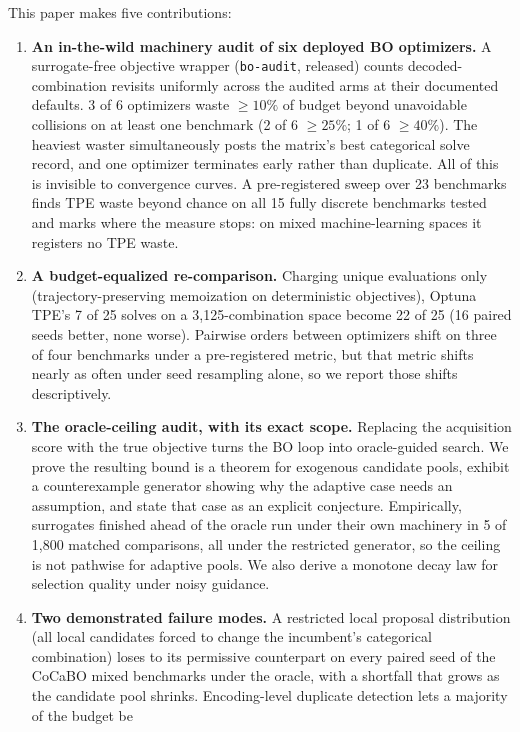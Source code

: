 \documentclass[%
 aip,
 amsmath,amssymb,
 floatfix,
 reprint,%
]{revtex4-1}
\begin{document}
This paper makes five contributions:
\begin{enumerate}
  \item \textbf{An in-the-wild machinery audit of six deployed BO
  optimizers.} A surrogate-free objective wrapper (\texttt{bo-audit},
  released) counts decoded-combination revisits uniformly across the
  audited arms at their documented defaults. 3 of 6 optimizers
  waste ${\ge}10\%$ of budget beyond unavoidable collisions on at least
  one benchmark (2 of 6 ${\ge}25\%$; 1 of 6 ${\ge}40\%$). The heaviest
  waster simultaneously posts the matrix's best categorical solve record, and one
  optimizer terminates early rather than duplicate. All of this is invisible
  to convergence curves. A pre-registered sweep over 23 benchmarks
  finds TPE waste beyond chance on all 15 fully discrete benchmarks
  tested and marks
  where the measure stops: on mixed machine-learning spaces it registers
  no TPE waste.
  \item \textbf{A budget-equalized re-comparison.} Charging unique
  evaluations only (trajectory-preserving memoization on deterministic
  objectives), Optuna TPE's 7 of 25 solves on a 3{,}125-combination
  space become 22 of 25 (16 paired seeds better, none worse). Pairwise
  orders between optimizers shift on three of four benchmarks under a
  pre-registered metric, but that metric shifts nearly as often under
  seed resampling alone, so we report those shifts descriptively.
  \item \textbf{The oracle-ceiling audit, with its exact scope.}
  Replacing the acquisition score with the true objective turns the BO
  loop into oracle-guided search. We prove the resulting bound is a
  theorem for exogenous candidate pools, exhibit a counterexample
  generator showing why the adaptive case needs an assumption, and state
  that case as an explicit conjecture. Empirically, surrogates finished
  ahead of the oracle run under their own machinery in 5 of 1{,}800
  matched comparisons, all under the restricted generator, so the
  ceiling is not pathwise for adaptive pools. We also derive a
  monotone decay law for selection quality under noisy guidance.
  \item \textbf{Two demonstrated failure modes.} A restricted local
  proposal distribution (all local candidates forced to change the
  incumbent's categorical combination) loses to its permissive
  counterpart on every paired seed of the CoCaBO mixed benchmarks under
  the oracle, with a shortfall that grows as the candidate pool shrinks.
  Encoding-level duplicate detection lets a majority of the budget be

\end{enumerate}
\end{document}
